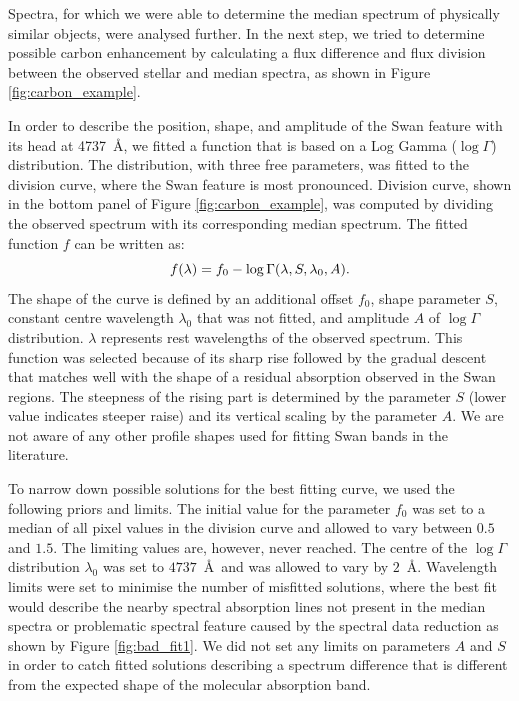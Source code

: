 Spectra, for which we were able to determine the median spectrum of physically similar objects, were analysed further. In the next step, we tried to determine possible carbon enhancement by calculating a flux difference and flux division between the observed stellar and median spectra, as shown in Figure \ref{fig:carbon_example}.

In order to describe the position, shape, and amplitude of the Swan feature with its head at 4737~\AA, we fitted a function that is based on a Log Gamma ($\log{}\Gamma$) distribution. The distribution, with three free parameters, was fitted to the division curve, where the Swan feature is most pronounced. Division curve, shown in the bottom panel of Figure \ref{fig:carbon_example}, was computed by dividing the observed spectrum with its corresponding median spectrum. The fitted function $f$ can be written as:
\begin{equation}
\centering
f(\lambda) = f_0 - \log{}\Gamma(\lambda, S, \lambda_0, A).
\label{equ:loggamma}
\end{equation}
The shape of the curve is defined by an additional offset $f_0$, shape parameter $S$, constant centre wavelength $\lambda_0$ that was not fitted, and amplitude $A$ of $\log{}\Gamma$ distribution. $\lambda$ represents rest wavelengths of the observed spectrum. This function was selected because of its sharp rise followed by the gradual descent that matches well with the shape of a residual absorption observed in the Swan regions. The steepness of the rising part is determined by the parameter $S$ (lower value indicates steeper raise) and its vertical scaling by the parameter $A$. We are not aware of any other profile shapes used for fitting Swan bands in the literature.

To narrow down possible solutions for the best fitting curve, we used the following priors and limits. The initial value for the parameter $f_0$ was set to a median of all pixel values in the division curve and allowed to vary between $0.5$ and $1.5$. The limiting values are, however, never reached. The centre of the $\log{}\Gamma$ distribution $\lambda_0$ was set to $4737$~\AA\ and was allowed to vary by $2$~\AA. Wavelength limits were set to minimise the number of misfitted solutions, where the best fit would describe the nearby spectral absorption lines not present in the median spectra or problematic spectral feature caused by the spectral data reduction as shown by Figure \ref{fig:bad_fit1}. We did not set any limits on parameters $A$ and $S$ in order to catch fitted solutions describing a spectrum difference that is different from the expected shape of the molecular absorption band.

